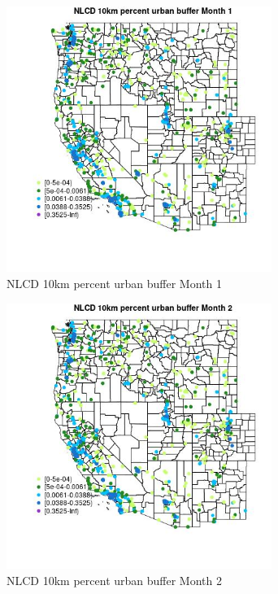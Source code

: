 \begin{figure} 
\centering  
\includegraphics[width=0.77\textwidth]{Code_Outputs/Report_ML_input_PM25_Step4_part_f_de_duplicated_aves_prioritize_24hr_obswNAs_MapObsMo1NLCD_10km_percent_urban_buffer.jpg} 
\caption{\label{fig:Report_ML_input_PM25_Step4_part_f_de_duplicated_aves_prioritize_24hr_obswNAsMapObsMo1NLCD_10km_percent_urban_buffer}NLCD 10km percent urban buffer Month 1} 
\end{figure} 
 

\begin{figure} 
\centering  
\includegraphics[width=0.77\textwidth]{Code_Outputs/Report_ML_input_PM25_Step4_part_f_de_duplicated_aves_prioritize_24hr_obswNAs_MapObsMo2NLCD_10km_percent_urban_buffer.jpg} 
\caption{\label{fig:Report_ML_input_PM25_Step4_part_f_de_duplicated_aves_prioritize_24hr_obswNAsMapObsMo2NLCD_10km_percent_urban_buffer}NLCD 10km percent urban buffer Month 2} 
\end{figure} 
 

